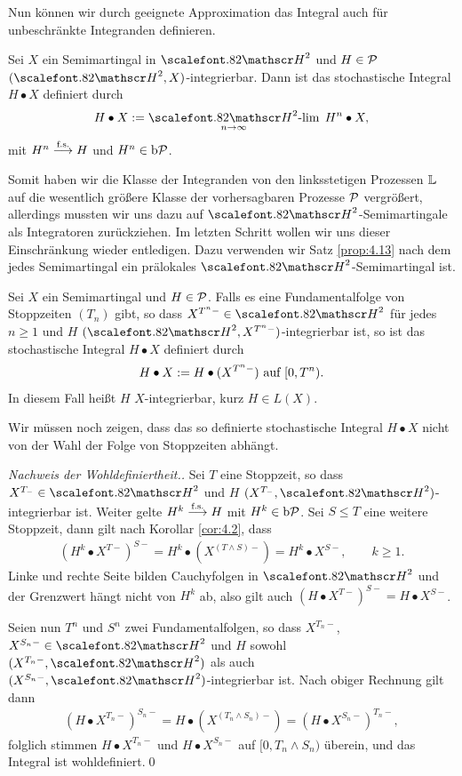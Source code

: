 Nun können wir durch geeignete Approximation das Integral auch für
unbeschränkte Integranden definieren.

\begin{definition}
\label{defn:4.6}
Sei $X$ ein Semimartingal in $\cH^2$ und $H\in\mathcal{P}$ $(\cH^2,X)$-integrierbar.
Dann ist das stochastische Integral $H \bullet X$ definiert durch
\begin{align*}
H\bullet X \defl \Hlim\limits_{n\to \infty}\; H^n\bullet X,
\end{align*}
mit $H^n\overset{\text{f.s.}}{\longrightarrow} H$ und $H^n\in\mathrm{b}\mathcal{P}$.\fish
\end{definition}

Somit haben wir die Klasse der Integranden von den linksstetigen Prozessen $\mathbb{L}$
auf die wesentlich größere Klasse der vorhersagbaren Prozesse $\mathcal{P}$ vergrößert,
allerdings mussten wir uns dazu auf $\HH^2$-Semimartingale als Integratoren
zurückziehen. Im letzten Schritt wollen wir uns dieser Einschränkung wieder
entledigen. Dazu verwenden wir Satz \ref{prop:4.13} nach dem jedes Semimartingal
ein prälokales $\HH^2$-Semimartingal ist.

\begin{definition}
\label{defn:4.7}
Sei $X$ ein Semimartingal und $H\in\mathcal{P}$. Falls es eine
Fundamentalfolge von Stoppzeiten $(T_n)$ gibt, so dass $X^{T^n-}\in \cH^2$
für jedes $n \ge 1$ und $H$ $(\cH^2,X^{T^n-})$-integrierbar ist, so ist das
stochastische Integral $H \bullet X$ definiert durch
\begin{align*}
H \bullet X := H \bullet (X^{T^n-}) \text{ auf $[0,T^n)$}.
\end{align*}
In diesem Fall heißt $H$ $X$-integrierbar, kurz $H \in L(X)$.\fish
\end{definition}

Wir müssen noch zeigen, dass das so definierte stochastische Integral $H \bullet
X$ nicht von der Wahl der Folge von Stoppzeiten abhängt.

\begin{proof}[Nachweis der Wohldefiniertheit.]
Sei $T$ eine Stoppzeit, so dass $X^{T_-}\in\HH^2$ und $H$
$(X^{T_-},\HH^2)$-integrierbar ist. Weiter gelte $H^k\overset{\text{f.s.}}{\longrightarrow} H$ mit $H^k\in
\mathrm{b}\mathcal{P}$. Sei $S\le T$ eine weitere Stoppzeit, dann gilt nach Korollar
\ref{cor:4.2}, dass
\begin{align*}
(H^k\bullet X^{T-})^{S-} = 
H^k\bullet (X^{(T\wedge S)-})
= H^k \bullet X^{S-},\qquad k\ge 1.
\end{align*}
Linke und rechte Seite bilden Cauchyfolgen in $\HH^2$ und der Grenzwert hängt
nicht von $H^k$ ab, also gilt auch $(H\bullet X^{T-})^{S-} = H\bullet X^{S-}$.

Seien nun $T^n$ und $S^n$ zwei Fundamentalfolgen, so dass $X^{T_n-}$, 
$X^{S_n-}\in\HH^2$ und $H$ sowohl $(X^{T_n-},\HH^2)$ als auch
$(X^{S_n-},\HH^2)$-integrierbar ist. Nach obiger Rechnung gilt dann
\begin{align*}
(H\bullet X^{T_n-})^{S_n-} = 
H\bullet (X^{(T_n\wedge S_n)-}) =
(H\bullet X^{S_n-})^{T_n-}, 
\end{align*}
folglich stimmen $H\bullet X^{T_n-}$ und $H\bullet X^{S_n-}$ auf $[0,T_n\wedge
S_n)$ überein, und das Integral ist wohldefiniert.\qed
\end{proof}

